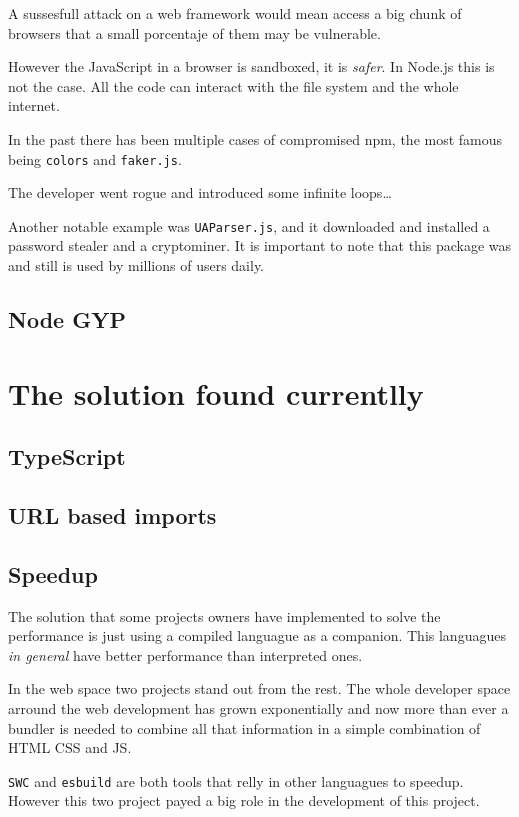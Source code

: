 \documentclass[12pt, letterpaper]{article}
\begin{document}
\begin{multicols}{2}
    A sussesfull attack on a web framework would mean access a big chunk of browsers that a small porcentaje of them may be vulnerable.

    However the JavaScript in a browser is sandboxed, it is \textit{safer}. In Node.js this is not the case. All the code can interact with the file system and the whole internet.

    In the past there has been multiple cases of compromised npm, the most famous being \verb|colors| and \verb|faker.js|.

    The developer went rogue and introduced some infinite loops\dots

    Another notable example was \verb|UAParser.js|, and it downloaded and installed a password stealer and a cryptominer. It is important to note that this package was and still is used by millions of users daily.


    \subsection{Node GYP}
    \section{The solution found currentlly}
    \subsection{TypeScript}
    \subsection{URL based imports}
    \subsection{Speedup}

    The solution that some projects owners have implemented to solve the performance is just using a compiled languague as a companion. This languagues \textit{in general} have better performance than interpreted ones.

    In the web space two projects stand out from the rest. The whole developer space arround the web development has grown exponentially and now more than ever a bundler is needed to combine all that information in a simple combination of HTML CSS and JS.

    \verb|SWC| and \verb|esbuild| are both tools that relly in other languagues to speedup. However this two project payed a big role in the development of this project.


\end{multicols}
\end{document}
